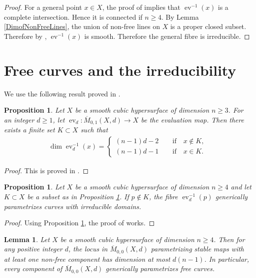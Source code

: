 \documentclass[dvipdfmx, 12pt, a4paper]{amsart}
\theoremstyle{plain}
\newtheorem{prop}[thm]{Proposition}
\newtheorem{lem}[thm]{Lemma}
\theoremstyle{definition}
\theoremstyle{remark}
\newcommand{\ra}{\rightarrow}
\DeclareMathOperator{\ev}{ev}
\newcommand{\ol}{\overline}
\begin{document}
		\begin{proof}
			For a general point $x\in X$, the proof of \cite[Proposition 4.2]{glas2025} implies that $\ev^{-1}(x)$ is a complete intersection. Hence it is connected if $n\geq4$. By Lemma \ref{DimofNonFreeLines}, the union of non-free lines on $X$ is a proper closed subset. Therefore by \cite[3.5.4 Corollary]{Kollar1996rational}, $\ev^{-1}(x)$ is smooth. Therefore the general fibre is irreducible.
		\end{proof}



\section{Free curves and the irreducibility}

	We use the following result proved in \cite{glas2025}.

	
	\begin{prop}\label{DimOfFibres}
		Let $X$ be a smooth cubic hypersurface of dimension $n\geq3$. For an integer $d\geq1$, let $\ev_d:\ol{M}_{0,1}(X,d)\ra X$ be the evaluation map. Then there exists a finite set $K\subset X$ such that
		\begin{align*}
			\dim\ev_d^{-1}(x)=
			\begin{cases}
				(n-1)d-2\qquad\text{if}\quad x\notin K,\\
				(n-1)d-1\qquad\text{if}\quad x\in K.
			\end{cases}
		\end{align*}
	\end{prop}

		\begin{proof}
			This is proved in \cite[Proof of Theorem 1.3]{glas2025}.
		\end{proof}
	
	\begin{prop}\label{IrredDomain}
		Let $X$ be a smooth cubic hypersurface of dimension $n\geq4$ and let $K\subset X$ be a subset as in Proposition \ref{DimOfFibres}. If $p\notin K$, the fibre $\ev_d^{-1}(p)$ generically parametrizes curves with irreducible domains.
	\end{prop}

		\begin{proof}
			Using Proposition \ref{DimOfFibres}, the proof of \cite[Proposition 2.5]{CoskunStarr2009} works.
		\end{proof}
	
	
	\begin{lem}\label{DimofNonFreeCurvesonCubic}
		Let $X$ be a smooth cubic hypersurface of dimension $n\geq4$. Then for any positive integer $d$, the locus in $\ol{M}_{0,0}(X,d)$ parametrizing stable maps with at least one non-free component has dimension at most $d(n-1)$. In particular, every component of $\ol{M}_{0,0}(X,d)$ generically parametrizes free curves.
	\end{lem}
\end{document}
